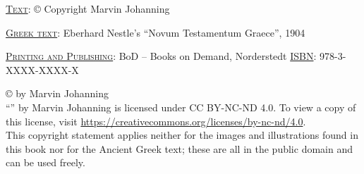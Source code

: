\thispagestyle{empty}
\vspace*{\fill}
\noindent\textsc{\underline{Text}}: © Copyright \the\year{} Marvin Johanning

\noindent\textsc{\underline{Greek text}}: Eberhard Nestle's ``Novum Testamentum Graece'', 1904


\noindent\textsc{\underline{Printing and Publishing}}: BoD – Books on Demand, Norderstedt
\noindent\textsc{\underline{ISBN}}: 978-3-XXXX-XXXX-X

\bigskip

\noindent© \the\year{} by Marvin Johanning \ccbyncnd\\``\thetitle'' by Marvin Johanning is licensed under CC BY-NC-ND 4.0. To view a copy of this license, visit \url{https://creativecommons.org/licenses/by-nc-nd/4.0}.\\This copyright statement applies neither for the images and illustrations found in this book nor for the Ancient Greek text; these are all in the public domain and can be used freely.

\vspace{30mm}
\noindent{}
\newpage